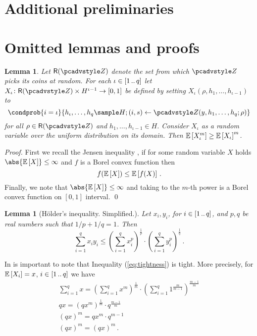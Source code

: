 \let\accentvec\vec \documentclass[runningheads]{llncs}
\newtheorem{lemma}[theorem]{Lemma}
\begin{document}
\section{Additional preliminaries}

\section{Omitted lemmas and proofs}
\begin{lemma}\label{lem:jensen}
	Let $\RND{\zdv}$ denote the set from which $\zdv$ picks its coins at random.
	For each $\iota \in [1 \, .. \, q]$ let $X_\iota \colon \RND{\zdv} \times
	H^{\iota - 1} \to [0, 1]$ be defined by setting $X_\iota(\rho, h_1, \ldots,
h_{\iota - 1})$ to 
	\[
		\condprob{i = \iota}{h_\iota, \ldots, h_q \sample H; (i, s) \gets \zdv(y, h_1, \ldots, h_q; \rho)} 
	\] 
	for all $\rho \in \RND{\zdv}$ and $h_1, \ldots, h_{\iota - 1} \in H$. Consider $X_\iota$ as a random variable over the uniform distribution on its domain. 
	Then $\mathbb{E}\left[X_\iota^m\right] \geq \mathbb{E}\left[X_\iota\right]^m$.
\end{lemma}
\begin{proof}
	First we recall the Jensen inequality \cite{W:Weissten20}, if for some random variable $X$ holds $\abs{\expected{X}} \leq \infty$ and $f$ is a Borel convex function then 
	\[
		f(\mathbb{E}\left[X\right]) \leq \mathbb{E}\left[f(X)\right]\,.
	\] 
	Finally, we note that $\abs{\expected{X}} \leq \infty$ and taking to the $m$-th power is a Borel convex function on $[0, 1]$ interval. 
	\qed
\end{proof}

\begin{lemma}[H\"older's inequality. Simplified.]\label{lem:holder}
	Let $x_i, y_i$, for $i \in [1 \, .. \, q]$, and $p, q$ be real numbers such that $1/p + 1/q = 1$. Then
	\[
		\sum_{i = 1}^{q} x_i y_i \leq \left(\sum_{i = 1}^{q} x_i^p\right)^{\frac{1}{p}} \cdot \left(\sum_{i = 1}^{q} y_i^p\right)^{\frac{1}{q}}\,.
	\]
\end{lemma}

\begin{remark}
	In is important to note that Inequality (\ref{eq:tightness}) is tight. More precisely, for $\mathbb{E}\left[X_i\right] = x$, $i \in [1 \, .. \, q]$ we have
	\begin{gather*}
		\sum_{i = 1}^q x = \left(\sum_{i = 1}^{q} x^m\right)^\frac{1}{m} \cdot \left(\sum_{i = 1}^{q} 1^{\frac{m}{m - 1}}\right)^{\frac{m - 1}{m}} \\
		qx = \left(qx^m\right)^\frac{1}{m} \cdot q^{\frac{m - 1}{m}} \\
		(qx)^m = qx^m \cdot q^{m - 1} \\
		(qx)^m = (qx)^m\,.
	\end{gather*}
\end{remark}
\end{document}
